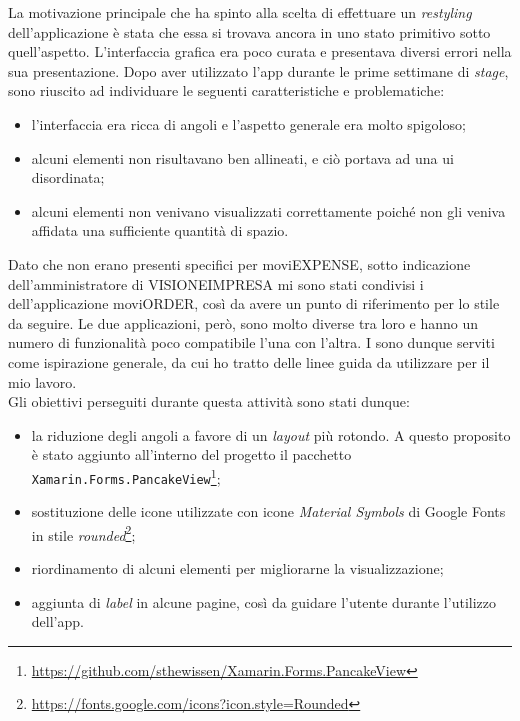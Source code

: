 La motivazione principale che ha spinto alla scelta di effettuare un \textit{restyling} dell'applicazione è stata che essa si trovava ancora in uno stato primitivo sotto quell'aspetto. L'interfaccia grafica era poco curata e presentava diversi errori nella sua presentazione. Dopo aver utilizzato l'app durante le prime settimane di \textit{stage}, sono riuscito ad individuare le seguenti caratteristiche e problematiche:
\begin{itemize}
    \item l'interfaccia era ricca di angoli e l'aspetto generale era molto spigoloso;
    \item alcuni elementi non risultavano ben allineati, e ciò portava ad una \acrshort{ui} disordinata;
    \item alcuni elementi non venivano visualizzati correttamente poiché non gli veniva affidata una sufficiente quantità di spazio.
\end{itemize}

\noindent Dato che non erano presenti \textit{} specifici per moviEXPENSE, sotto indicazione dell'amministratore di VISIONEIMPRESA mi sono stati condivisi i \textit{} dell'applicazione moviORDER, così da avere un punto di riferimento per lo stile da seguire. Le due applicazioni, però, sono molto diverse tra loro e hanno un numero di funzionalità poco compatibile l'una con l'altra. I \textit{} sono dunque serviti come ispirazione generale, da cui ho tratto delle linee guida da utilizzare per il mio lavoro.\\
Gli obiettivi perseguiti durante questa attività sono stati dunque:
\begin{itemize}
    \item la riduzione degli angoli a favore di un \textit{layout} più rotondo. A questo proposito è stato aggiunto all'interno del progetto il pacchetto \texttt{Xamarin.Forms.PancakeView}\footnote{\url{https://github.com/sthewissen/Xamarin.Forms.PancakeView}};
    \item sostituzione delle icone utilizzate con icone \textit{Material Symbols} di Google Fonts in stile \textit{rounded}\footnote{\url{https://fonts.google.com/icons?icon.style=Rounded}};
    \item riordinamento di alcuni elementi per migliorarne la visualizzazione;
    \item aggiunta di \textit{label} in alcune pagine, così da guidare l'utente durante l'utilizzo dell'app.
\end{itemize}

